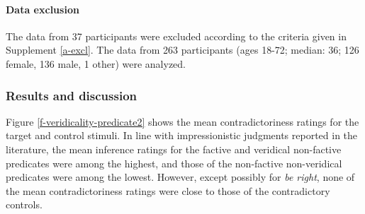 \documentclass[11pt,fleqn]{article}
\newcommand{\6}{\mbox{$[\hspace*{-.6mm}[$}}
\newcommand{\9}{\mbox{$]\hspace*{-.6mm}]$}}
\begin{document}
{%
%
%


\paragraph{Data exclusion} The data from 37 participants were excluded according to the criteria given in Supplement \ref{a-excl}. The data from 263 participants (ages 18-72; median: 36; 126 female, 136 male, 1 other) were analyzed.

\subsubsection{Results and discussion}


Figure \ref{f-veridicality-predicate2} shows the mean contradictoriness ratings for the target and control stimuli. In line with impressionistic judgments reported in the literature, the mean inference ratings for the factive and veridical non-factive predicates were among the highest, and those of the non-factive non-veridical predicates were among the lowest. However, except possibly for {\em be right}, none of the mean contradictoriness ratings were close to those of the contradictory controls.

}
\end{document}

